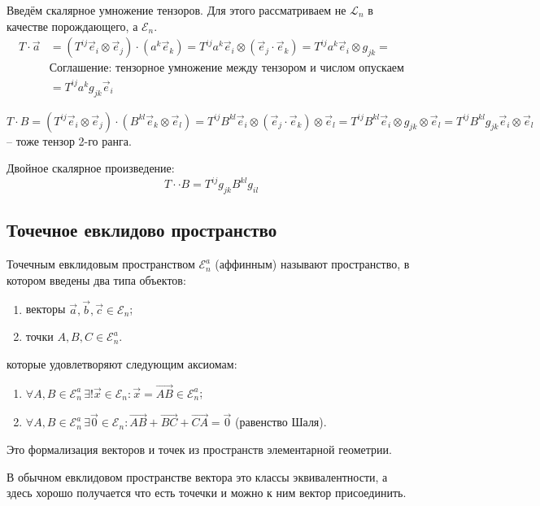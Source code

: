 Введём скалярное умножение тензоров. Для этого рассматриваем не $\mathcal{L}_n$ в качестве
порождающего, а $\mathcal{E}_n$.
\begin{align*}
  T \cdot \vec{a} &= (T^{ij} \vec{e}_i \otimes \vec{e}_j) \cdot (a^k \vec{e}_k)
  = T^{ij} a^k \vec{e}_i \otimes (\vec{e}_j \cdot \vec{e}_k)
  = T^{ij} a^k \vec{e}_i \otimes g_{jk} = \\
  &\text{Соглашение: тензорное умножение между тензором и числом опускаем} \\
  &= T^{ij} a^k g_{jk} \vec{e}_i
\end{align*}

\[
  T \cdot B = (T^{ij} \vec{e}_i \otimes \vec{e}_j) \cdot (B^{kl} \vec{e}_k \otimes \vec{e}_l)
  = T^{ij} B^{kl} \vec{e}_i \otimes (\vec{e}_j \cdot \vec{e}_k) \otimes \vec{e}_l
  = T^{ij} B^{kl} \vec{e}_i \otimes g_{jk} \otimes \vec{e}_l
  = T^{ij} B^{kl} g_{jk} \vec{e}_i \otimes \vec{e}_l
\]
-- тоже тензор 2-го ранга.

Двойное скалярное произведение:
\[
  T \cdot \cdot B = T^{ij} g_{jk} B^{kl} g_{il}
\]

\subsection{Точечное евклидово пространство}

\begin{definition}
  Точечным евклидовым пространством $\mathcal{E}_n^a$ (аффинным) называют пространство, в котором
  введены два типа объектов:
  \begin{enumerate}
    \item векторы $\vec{a}, \vec{b}, \vec{c} \in \mathcal{E}_n$;
    \item точки $A, B, C \in \mathcal{E}_n^a$.
  \end{enumerate}
  которые удовлетворяют следующим аксиомам:
  \begin{enumerate}
    \item $\forall A, B \in \mathcal{E}_n^a \, \exists! \vec{x} \in \mathcal{E}_n : \vec{x} = \vec{AB} \in \mathcal{E}_n^a$;
    \item $\forall A, B \in \mathcal{E}_n^a \, \exists \vec{0} \in \mathcal{E}_n : \vec{AB} + \vec{BC} + \vec{CA} = \vec{0}$ (равенство Шаля).
  \end{enumerate}
  Это формализация векторов и точек из пространств элементарной геометрии.
\end{definition}

В обычном евклидовом пространстве вектора это классы эквивалентности, а здесь хорошо получается 
что есть точечки и можно к ним вектор присоединить.

